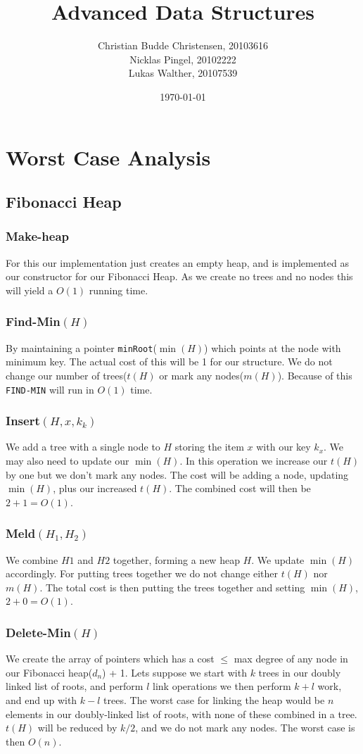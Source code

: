 \documentclass[a4paper,10pt]{article}
\author{Christian Budde Christensen, 20103616\\Nicklas Pingel, 20102222\\Lukas Walther, 20107539}
\title{Advanced Data Structures}
\date{\today}
\begin{document}
\maketitle
\tableofcontents 
\clearpage
\section{Worst Case Analysis}
\subsection{Fibonacci Heap}
\subsubsection*{Make-heap}
For this our implementation just creates an empty heap, and is implemented as our constructor for our Fibonacci Heap. As we create no trees and no nodes this will yield a $O(1)$ running time.
\subsubsection*{Find-Min$(H)$}
By maintaining a pointer \texttt{minRoot}($\min(H)$) which points at the node with minimum key. The actual cost of this will be 1 for our structure. We do not change our number of trees($t(H)$ or mark any nodes($m(H)$). Because of this \texttt{FIND-MIN} will run in $O(1)$ time.
\subsubsection*{Insert$(H,x,k_k)$}
We add a tree with a single node to $H$ storing the item $x$ with our key $k_x$. We may also need to update our $\min(H)$. In this operation we increase our $t(H)$ by one but we don't mark any nodes. The cost will be adding a node, updating $\min(H)$, plus our increased $t(H)$. The combined cost will then be $2+1=O(1)$.
\subsubsection*{Meld$(H_1, H_2)$}
We combine $H1$ and $H2$ together, forming a new heap $H$. We update $\min(H)$ accordingly. For putting trees together we do not change either $t(H)$ nor $m(H)$. The total cost is then putting the trees together and setting $\min(H)$, $2+0=O(1)$.
\subsubsection*{Delete-Min$(H)$}
We create the array of pointers which has a cost $\leq$ max degree of any node in our Fibonacci heap($d_n$) + 1. Lets suppose we start with $k$ trees in our doubly linked list of roots, and perform $l$ link operations we then perform $k+l$ work, and end up with $k-l$ trees. The worst case for linking the heap would be $n$ elements in our doubly-linked list of roots, with none of these combined in a tree. $t(H)$ will be reduced by $k/2$, and we do not mark any nodes. The worst case is then $O(n)$. 
\end{document}
